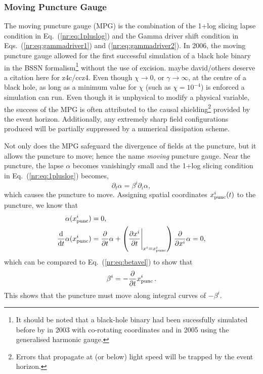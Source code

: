 \subsubsection{Moving Puncture Gauge}
The moving puncture gauge (MPG) is the combination of the 1+log slicing lapse condition
in Eq.~(\ref{nr:eq:1pluslog}) and the Gamma driver shift condition in
Eqs.~(\ref{nr:eq:gammadriver1}) and (\ref{nr:eq:gammadriver2}). In 2006, the
moving puncture gauge allowed for the first successful simulation of a black hole
binary \cite{PhysRevLett.96.111101} in the \color{orchid} BSSN \color{black}
formalism\footnote{It should be noted that a black-hole binary had been sucessfully
simulated before by \cite{Bruegmann:2003aw} in 2003 with co-rotating coordinates
and \cite{Pretorius:2005gq} in 2005 using the generalised harmonic gauge.} without
the use of excision. \color{gren} maybe david/others deserve a citation here for
z4c/ccz4. \color{black} Even though $\chi\rightarrow 0$, or $\gamma \rightarrow \infty$,
at the centre of a black hole, as long as a minimum value for $\chi$
(such as $\chi=10^{-4}$) is enforced a simulation can run. \color{orchid} Even though it is
unphysical to modify a physical variable, the success of the MPG is often attributed
to the causal shielding\footnote{\color{orchid} Errors that propagate at (or below) light speed
will be trapped by the event horizon. } provided by the
event horizon. Additionally, any extremely sharp field configurations produced will
be partially suppressed by a numerical dissipation scheme.\color{black}

Not only does the MPG safeguard the divergence of fields at the puncture, but it allows the puncture to move; hence the name {\it moving} puncture gauge. Near the puncture, the lapse $\alpha$ becomes vanishingly small and the 1+log slicing condition in Eq.~(\ref{nr:eq:1pluslog}) becomes,
\begin{equation}
\partial_t \alpha = \beta^i \partial_i \alpha, \label{nr:eq:betavel}
\end{equation}
which causes the puncture to move. Assigning spatial coordinates $x^i_{\rm punc}(t)$ to the puncture, we know that
\begin{align}
\alpha(x^i_{\rm punc}) &= 0,\\
\frac{\dd}{\dd t} \alpha(x^i_{\rm punc})  &= \frac{\partial}{\partial t}\alpha + \left(\frac{\partial x^i}{\partial t}\Bigg|_{x^i=x^i_{\rm punc}}\right)\frac{\partial}{\partial x^i} \alpha =0,
\end{align}
which can be compared to Eq.~(\ref{nr:eq:betavel}) to show that
\begin{equation}
\beta^i = -\frac{\partial }{\partial t}x^i_{\rm punc}\,.
\end{equation}
This shows that the puncture must move along integral curves of $-\beta^i$.
